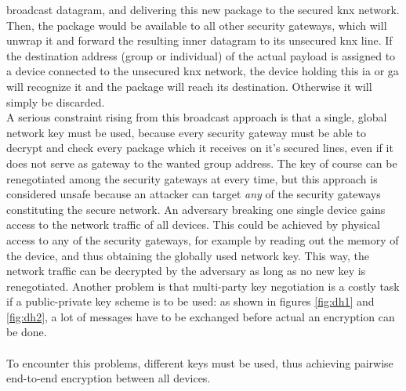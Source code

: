 broadcast datagram, and delivering this new package to the secured \gls{knx} network. Then, the package would be available to all other security gateways, which
will unwrap it and forward the resulting inner datagram to its unsecured \gls{knx} line. If the destination address (group or individual) of the actual payload
is assigned to a device connected
to the unsecured \gls{knx} network, the device holding this \gls{ia} or \gls{ga} will recognize it and the package will reach its destination. 
Otherwise it will simply be discarded.
\\
A serious constraint rising from this broadcast approach is that a single,
global network key must be used, because every security gateway must be able to decrypt and check every package which it receives on it's secured lines,
even if it does not serve as gateway to the wanted group address. 
The key of course can be renegotiated among the security gateways at every time, but this approach is considered
unsafe because an attacker can target \textit{any} of the security gateways constituting the secure network. An adversary breaking one single device gains
access to the network traffic of all devices. This could be achieved by physical access to any of the security gateways, for example by reading out the
memory of the device, and thus obtaining the globally used network key. This way, the network traffic can be decrypted by the adversary as long as no new
key is renegotiated. Another problem is that multi-party key negotiation is a costly task if a public-private key scheme
is to be used: as shown in figures \ref{fig:dh1} and \ref{fig:dh2}, a lot of messages have to be exchanged before actual an encryption can be done. 
\\
\\
To encounter this problems, different keys must be used, thus achieving pairwise end-to-end encryption between all devices. 
